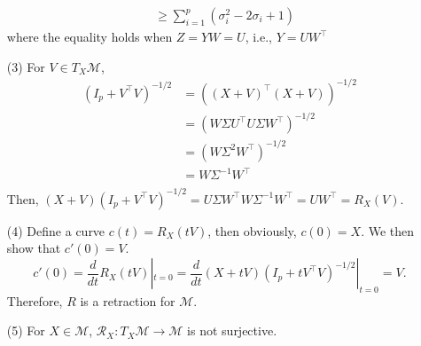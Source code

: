 \documentclass[en, oneside]{assignment}
\begin{document}
\begin{sol}
\begin{itemize}
\begin{align*}
            & \geq \sum_{i = 1}^p (\sigma_i^2 - 2\sigma_i + 1)
        \end{align*}
        where the equality holds when $Z = YW = U$, i.e., $Y = UW^\top$
        \item[(3)] For $V \in T_X\mathcal{M}$,
        \begin{align*}
            (I_p + V^\top V)^{-1/2} & =((X + V)^\top(X + V))^{-1/2}\\
            & = (W \Sigma U^\top U \Sigma W^\top)^{-1/2}\\
            & = (W \Sigma^2 W^\top)^{-1/2}\\
            & = W \Sigma^{-1} W^\top\\
        \end{align*}
        Then, $(X + V)(I_p + V^\top V)^{-1/2} = U \Sigma W^\top W \Sigma^{-1} W^\top = UW^\top = R_X(V)$.
        \item[(4)] Define a curve $c(t) = R_X(tV)$, then obviously, $c(0) = X$. We then show that $c'(0) = V$.
        \begin{equation*}
            c'(0) = \frac{d}{dt} R_X(tV)|_{t=0} = \frac{d}{dt} (X + tV)(I_p + tV^\top V)^{-1/2}|_{t=0} = V.
        \end{equation*}
        Therefore, $R$ is a retraction for $\mathcal{M}$.
        \item[(5)] For $X \in \mathcal{M}$, $\mathcal{R}_X: T_X\mathcal{M} \rightarrow \mathcal{M}$ is not surjective.
    \end{itemize}
\end{sol}
\end{document}

